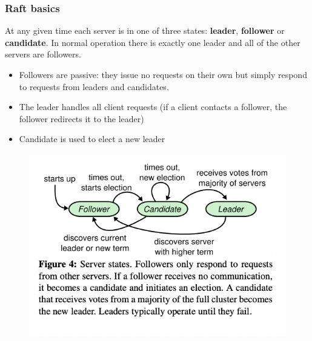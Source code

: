 \documentclass[11pt]{article}
\begin{document}
\subsubsection{Raft basics}
\label{sec:org70f41e5}
At any given time each server is in one of three states: \textbf{leader}, \textbf{follower} or \textbf{candidate}. In
normal operation there is exactly one leader and all of the other servers are followers.
\begin{itemize}
\item Followers are passive: they issue no requests on their own but simply respond to requests from
leaders and candidates.
\item The leader handles all client requests (if a client contacts a follower, the follower
redirects it to the leader)
\item Candidate is used to elect a new leader
\end{itemize}
\begin{figure}[htbp]
\centering
\includegraphics[width=.7\textwidth]{../images/6.824/4.png}
\label{}
\end{figure}
\end{document}
